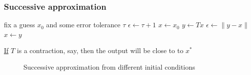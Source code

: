\begin{frame}
    \frametitle{Successive approximation}

    \vspace{0.3em}
    \begin{algorithm}[H]
      \DontPrintSemicolon
      fix a guess $x_0$ and some error tolerance $\tau$ \;
      $\epsilon \leftarrow \tau + 1$ \;
      $x \leftarrow x_0$ \;
      \While{$\epsilon > \tau$}
      {
          $y \leftarrow T x$ \;
          $\epsilon \leftarrow \| y - x \|$ \;
          $x \leftarrow y$ \;
      }
    \end{algorithm}

    \vspace{0.3em}
    \vspace{0.3em}
    \underline{If} $T$ is a contraction, say, then the output will be close to
    to $x^*$

    
\end{frame}


\begin{frame}
    

\end{frame}

\begin{frame}
    

    \begin{figure}
        \centering
        \caption{\label{f:linear_iter_fig_1} 
            Successive approximation from different initial conditions}
    \end{figure}

\end{frame}


